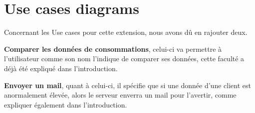 \section{Use cases diagrams}

\begin{flushleft}
Concernant les Use cases pour cette extension, nous avons dû en rajouter deux.
\end{flushleft}

\begin{flushleft}
\textbf{Comparer les données de consommations}, celui-ci va permettre à l'utilisateur comme son nom l'indique de comparer ses données, cette faculté a déjà été expliqué dans l'introduction.
\end{flushleft}

\begin{flushleft}
\textbf{Envoyer un mail}, quant à celui-ci, il spécifie que si une donnée d'une client est anormalement élevée, alors le serveur enverra un mail pour l'avertir, comme expliquer également dans l'introduction.
\end{flushleft}

%